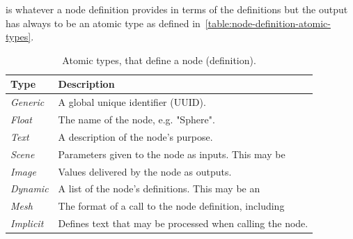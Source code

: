 \documentclass[%
    a4paper,    %
    justified,  %
    nobib,      %
    openany     %
]{tufte-book}
\newcommand{\ra}[1]{\renewcommand{\arraystretch}{#1}}
\begin{document}
 is whatever a node definition provides in terms of the
definitions but the output has always to be an atomic type as defined
in~\autoref{table:node-definition-atomic-types}.

\begin{table}\centering
  \ra{1.3}
  \begin{tabularx}{\textwidth}{@{}lX@{}}
    \toprule
    \textbf{Type}    & \textbf{Description}                                         \\
    \hline
    \textit{Generic}          & A global unique identifier (UUID\protect\footnotemark[1]{}). \\
    \textit{Float}        & The name of the node, e.g. "Sphere".                         \\
    \textit{Text} & A description of the node's purpose.                         \\
    \textit{Scene}      & Parameters given to the node as inputs. This may be \\
    \textit{Image}     & Values delivered by the node as outputs.                     \\
    \textit{Dynamic} & A list of the node's definitions. This may be an \\
    \textit{Mesh}  & The format of a call to the node definition, including \\
    \textit{Implicit}       & Defines text that may be processed when calling the node.\\
    \bottomrule
  \end{tabularx}
  \caption{Atomic types, that define a node (definition).}
  \label{lst:node-definition-atomic-types}
\end{table}
\end{document}
